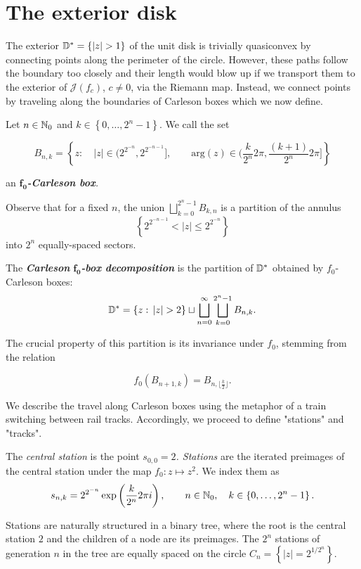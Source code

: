 \section{The exterior disk}

The exterior $\D^{*}=\left\{ \left|z\right|>1\right\} $ of the unit
disk is trivially quasiconvex by connecting points along the perimeter
of the circle. However, these paths follow the boundary too closely
and their length would blow up if we transport them to the exterior
of $\mathcal{J}(f_{c})$, $c\neq0$, via the Riemann map. Instead,
we connect points by traveling along the boundaries of Carleson boxes
which we now define.
\begin{definition}
Let $n\in\mathbb{N}_{0}$ and $k\in\left\{ 0,\ldots,2^{n}-1\right\} $. We
call the set

\[
B_{n,k}=\left\{ z:\quad\left|z\right|\in\biggl(2^{2^{-n}},2^{2^{-n-1}}\biggl],\qquad\mathrm{arg}(z)\in\biggl(\frac{k}{2^{n}}2\pi,\frac{(k+1)}{2^{n}}2\pi\biggl]\right\} 
\]

an \emph{$\boldsymbol{f_{0}}$}\textbf{\emph{-Carleson box}}\emph{.} 

Observe that for a fixed $n$, the union $\bigsqcup_{k=0}^{2^{n}-1}B_{k,n}$
is a partition of the annulus 
\[
\left\{ 2^{2^{-n-1}}<\left|z\right|\leq2^{2^{-n}}\right\} 
\]
 into $2^{n}$ equally-spaced sectors.

The\emph{ }\textbf{\emph{Carleson }}\emph{$\boldsymbol{f_{0}}$}\textbf{\emph{-box
decomposition}} is the partition of $\mathbb{D}^{*}$ obtained by $f_{0}$-Carleson
boxes:
\[
\D^{*}=\left\{ z:\,\left|z\right|>2\right\} \sqcup\bigsqcup_{n=0}^{\infty}\bigsqcup_{k=0}^{2^{n}-1}B_{n,k}.
\]

The crucial property of this partition is its invariance under $f_{0}$,
stemming from the relation

\[
f_{0}\left(B_{n+1,k}\right)=B_{n,\lfloor\frac{k}{2}\rfloor}.
\]
\end{definition}

We describe the travel along Carleson boxes using the metaphor of a train switching between rail tracks. Accordingly,
we proceed to define "stations" and "tracks".


\begin{definition}
The \emph{central station }is the point\emph{ $s_{0,0}=2$. Stations
}are the iterated preimages of the central station under the map $f_{0}:z\mapsto z^{2}$.
We index them as 
\[
s_{n,k}=2^{2^{-n}}\exp\left(\frac{k}{2^{n}}2\pi i\right),\qquad n\in\mathbb{N}_{0},\quad k\in\left\{ 0,\ldots,2^{n}-1\right\} .
\]

Stations are naturally structured in a binary tree, where the root
is the central station $2$ and the children of a node are its preimages.
The $2^{n}$ stations of generation $n$ in the tree are equally spaced
on the circle $C_{n}=\left\{ \left|z\right|=2^{1/2^{n}}\right\} $. 


\end{definition}

